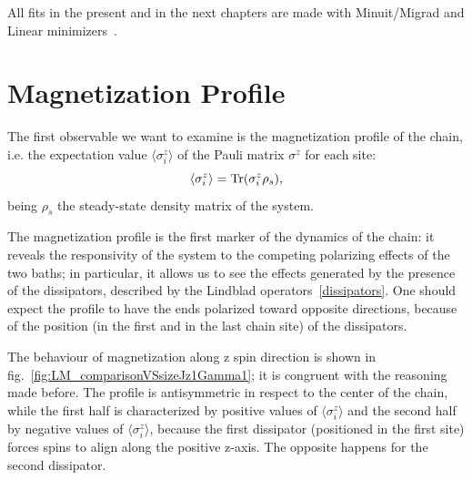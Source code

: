 All fits in the present and in the next chapters are made with Minuit/Migrad and Linear minimizers~\cite{root_cern}.

\section{Magnetization Profile}
\label{sec:magn_profile}
The first observable we want to examine is the magnetization profile of the chain, i.e. the expectation value $\langle \sigma_i^z \rangle$ of the Pauli matrix $\sigma^z$ for each site:
\begin{equation*}
    \langle \sigma_i^z \rangle = \operatorname{Tr}(\sigma_i^z \rho_s),
\end{equation*}
being $\rho_s$ the steady-state density matrix of the system.

The magnetization profile is the first marker of the dynamics of the chain:  it reveals the responsivity of the system to the competing polarizing effects of the two baths; in particular, it allows us to see the effects generated by the presence of the dissipators, described by the Lindblad operators~\ref{dissipators}. One should expect the profile to have the ends polarized toward opposite directions, because of the position (in the first and in the last chain site) of the dissipators.

The behaviour of magnetization along z spin direction is shown in fig.~\ref{fig:LM_comparisonVSsizeJz1Gamma1}; it is congruent with the reasoning made before. The profile is antisymmetric in respect to the center of the chain, while the first half is characterized by positive values of  $\langle \sigma_i^z \rangle$ and the second half by negative values of $\langle \sigma_i^z \rangle$, because the first dissipator (positioned in the first site) forces spins to align along the positive z-axis. The opposite happens for the second dissipator.



